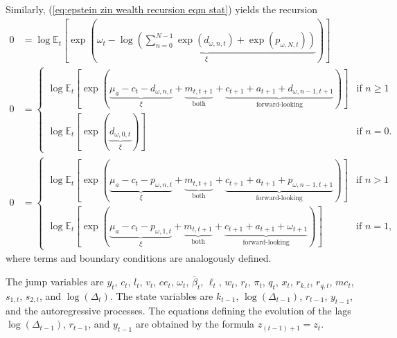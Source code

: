 \documentclass[12 pt, oneside]{article}
\theoremstyle{definition}
\theoremstyle{definition}
\theoremstyle{definition}
\newcommand{\E}{\mathbb{E}}
\begin{document}
Similarly, (\ref{eq:epstein zin wealth recursion eqm stat}) yields the recursion
\begin{align}
  0 & = \log\E_t\left[\exp\left(\underbrace{\omega_t - \log\left(\sum_{n = 0}^{N - 1}\exp(d_{\omega, n, t}) + \exp(p_{\omega, N, t})\right)}_{\xi}\right)\right]\\
  0 & =
      \begin{cases}
        \log\E_t\left[\exp\left(\underbrace{\mu_a - c_t - d_{\omega, n, t}}_{\xi} + \underbrace{m_{t, t + 1}}_{\text{both}} + \underbrace{c_{t + 1} + a_{t + 1} + d_{\omega, n - 1, t + 1}}_{\text{forward-looking}}\right)\right] & \text{if } n \geq 1\\
        \log\E_t\left[\exp\left(\underbrace{d_{\omega, 0, t}}_{\xi}\right)\right] & \text{if } n = 0.
      \end{cases}\\
  0 & =
      \begin{cases}
        \log\E_t\left[\exp\left(\underbrace{\mu_a - c_t - p_{\omega, n, t}}_{\xi} + \underbrace{m_{t, t + 1}}_{\text{both}} + \underbrace{c_{t + 1} + a_{t + 1} + p_{\omega, n - 1, t + 1}}_{\text{forward-looking}} \right)\right] & \text{if } n > 1\\
        \log\E_t\left[\exp\left(\underbrace{\mu_a - c_t - p_{\omega, 1, t}}_{\xi} + \underbrace{m_{t, t + 1}}_{\text{both}} + \underbrace{c_{t + 1} + a_{t + 1} + \omega_{t + 1}}_{\text{forward-looking}}\right)\right] & \text{if } n = 1,
      \end{cases}
\end{align}
where terms and boundary conditions are analogously defined.

The jump variables are $y_t$, $c_t$, $l_t$, $v_t$, $ce_t$, $\omega_t$, $\overline{\beta}_t$, $\ell_t$, $w_t$, $r_t$, $\pi_t$, $q_t$, $x_t$, $r_{k, t}$, $r_{q, t}$, $mc_t$, $s_{1, t}$, $s_{2, t}$, and $\log(\Delta_t)$.
The state variables are $k_{t - 1}$, $\log(\Delta_{t - 1})$, $r_{t - 1}$, $y_{t - 1}$, and the autoregressive processes. The equations defining the evolution of the lags $\log(\Delta_{t - 1})$, $r_{t - 1}$, and $y_{t - 1}$ are obtained by the formula $z_{(t - 1) + 1} = z_t$.
\end{document}
